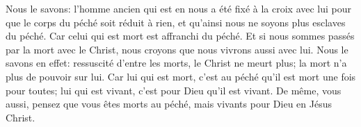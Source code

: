 Nous le savons: l’homme ancien qui est en nous a été fixé à la croix avec lui
	pour que le corps du péché soit réduit à rien,
	et qu’ainsi nous ne soyons plus esclaves du péché.
Car celui qui est mort est affranchi du péché.
Et si nous sommes passés par la mort avec le Christ,
	nous croyons que nous vivrons aussi avec lui.
Nous le savons en effet:
	ressuscité d’entre les morts, le Christ ne meurt plus;
	la mort n’a plus de pouvoir sur lui.
Car lui qui est mort, c'est au péché qu'il est mort une fois pour toutes;
	lui qui est vivant, c'est pour Dieu qu'il est vivant.
De même, vous aussi, pensez que vous êtes morts au péché,
	mais vivants pour Dieu en Jésus Christ.
